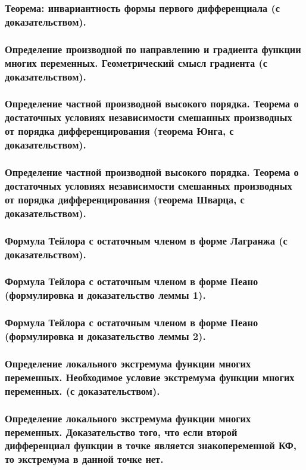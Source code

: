 \documentclass[10pt]{article}
\begin{document}
    \subsubsection{Теорема: инвариантность формы первого дифференциала (с доказательством).}
    \subsubsection{Определение производной по направлению и градиента функции многих переменных. Геометрический смысл градиента (с доказательством).}
    \subsubsection{Определение частной производной высокого порядка. Теорема о достаточных условиях независимости смешанных производных от порядка дифференцирования (теорема Юнга, с доказательством).}
    \subsubsection{Определение частной производной высокого порядка. Теорема о достаточных условиях независимости смешанных производных от порядка дифференцирования (теорема Шварца, с доказательством).}
    \subsubsection{Формула Тейлора с остаточным членом в форме Лагранжа (с доказательством).}
    \subsubsection{Формула Тейлора с остаточным членом в форме Пеано (формулировка и доказательство леммы 1).}
    \subsubsection{Формула Тейлора с остаточным членом в форме Пеано (формулировка и доказательство леммы 2).}
    \subsubsection{Определение локального экстремума функции многих переменных. Необходимое условие экстремума функции многих переменных. (с доказательством).}
    \subsubsection{Определение локального экстремума функции многих переменных. Доказательство того, что если второй дифференциал функции в точке является знакопеременной КФ, то экстремума в данной точке нет.}
\end{document}
